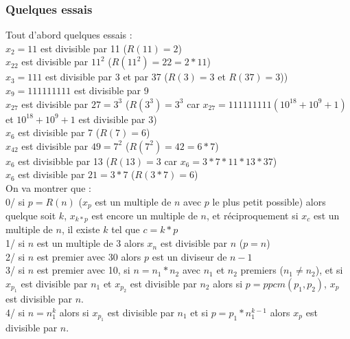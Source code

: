 \documentclass[a4paper,11pt]{book}
\begin{document}
\subsubsection{Quelques essais}
Tout d'abord quelques essais :\\
$x_2=11$ est divisible par 11 ($R(11)=2$)\\
$x_{22}$ est divisible par $11^2$ ($R(11^2)=22=2*11$)\\
$x_3=111$ est divisible par 3 et par 37 ($R(3)=3$ et $R(37)=3$))\\
$x_9=111111111$ est divisible par 9\\
$x_{27}$  est divisible par $27=3^3$ ($R(3^3)=3^3$ car $x_{27}=111111111(10^18+10^9+1)$ et $10^18+10^9+1$ est divisible par 3)\\
$x_6$ est divisible par 7 ($R(7)=6$)\\
$x_{42}$ est divisible par $49=7^2$ ($R(7^2)=42=6*7$)\\
$x_6$ est divisibble par 13 ($R(13)=3$ car $x_6=3*7*11*13*37$)\\
$x_6$ est divisible par $21=3*7$ ($R(3*7)=6$)\\
On va montrer que :\\
0/ si $p=R(n)$ ($x_p$ est un multiple de $n$ avec $p$ le plus petit possible)
 alors quelque soit $k$,
$x_{k*p}$ est encore un multiple de $n$, et r\'eciproquement si
$x_c$ est un multiple de $n$, il existe $k$ tel que $c=k*p$\\
1/ si $n$ est un multiple de 3 alors $x_n$ est divisible par $n$ ($p=n$)\\
2/ si $n$ est premier avec 30 alors $p$ est un diviseur de $n-1$\\
3/ si $n$ est premier avec 10, si $n=n_1*n_2$ avec $n_1$ et $n_2$ premiers ($n_1 \neq n_2$), et si $x_{p_1}$ est divisible par 
$n_1$ et $x_{p_2}$ est divisible par $n_2$ alors si $p= ppcm(p_1,p_2)$, 
$x_p$ est divisible par $n$.\\
4/ si $n=n_1^k$ alors si $x_{p_1}$ est divisible par  $n_1$ et si 
$p=p_1*n_1^{k-1}$ alors $x_p$ est divisible par $n$.
\end{document}
